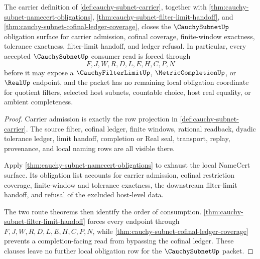 \begin{theorem}
\label{thm:cauchy-subnet-obligation-closure-package}
The carrier definition of \autoref{def:cauchy-subnet-carrier}, together with \autoref{thm:cauchy-subnet-namecert-obligations}, \autoref{thm:cauchy-subnet-filter-limit-handoff}, and \autoref{thm:cauchy-subnet-cofinal-ledger-coverage}, closes the $\CauchySubnetUp$ obligation surface for carrier admission, cofinal coverage, finite-window exactness, tolerance exactness, filter-limit handoff, and ledger refusal. In particular, every accepted $\CauchySubnetUp$ consumer read is forced through
$$
F,J,W,R,D,L,E,H,C,P,N
$$
before it may expose a $\CauchyFilterLimitUp$, $\MetricCompletionUp$, or $\RealUp$ endpoint, and the packet has no remaining local obligation coordinate for quotient filters, selected host subnets, countable choice, host real equality, or ambient completeness.
\end{theorem}
\begin{proof}
Carrier admission is exactly the row projection in \autoref{def:cauchy-subnet-carrier}. The source filter, cofinal ledger, finite windows, rational readback, dyadic tolerance ledger, limit handoff, completion or Real seal, transport, replay, provenance, and local naming rows are all visible there.

Apply \autoref{thm:cauchy-subnet-namecert-obligations} to exhaust the local NameCert surface. Its obligation list accounts for carrier admission, cofinal restriction coverage, finite-window and tolerance exactness, the downstream filter-limit handoff, and refusal of the excluded host-level data.

The two route theorems then identify the order of consumption. \autoref{thm:cauchy-subnet-filter-limit-handoff} forces every endpoint through $F,J,W,R,D,L,E,H,C,P,N$, while \autoref{thm:cauchy-subnet-cofinal-ledger-coverage} prevents a completion-facing read from bypassing the cofinal ledger. These clauses leave no further local obligation row for the $\CauchySubnetUp$ packet.
\end{proof}

